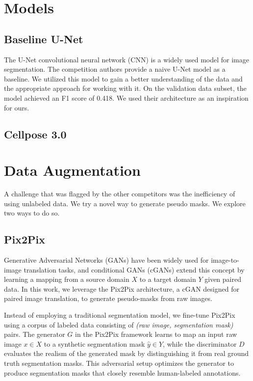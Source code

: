 \documentclass[]{article}
\begin{document}
\section{Models}

\subsection{Baseline U-Net}
The U-Net convolutional neural network (CNN) is a widely used model for image segmentation. The competition authors provide a naive U-Net model as a baseline. We utilized this model to gain a better understanding of the data and the appropriate approach for working with it. On the validation data subset, the model achieved an F1 score of 0.418. We used their architecture as an inspiration for ours.
\subsection{Cellpose 3.0}


\section{Data Augmentation}

A challenge that was flagged by the other competitors was the inefficiency of using unlabeled data. We try a novel way to generate pseudo masks. We explore two ways to do so.
\subsection{Pix2Pix}
Generative Adversarial Networks (GANs) have been widely used for image-to-image translation tasks, and conditional GANs (cGANs) extend this concept by learning a mapping from a source domain \( X \) to a target domain \( Y \) given paired data. In this work, we leverage the Pix2Pix architecture, a cGAN designed for paired image translation, to generate pseudo-masks from raw images.

Instead of employing a traditional segmentation model, we fine-tune Pix2Pix using a corpus of labeled data consisting of \textit{(raw image, segmentation mask)} pairs. The generator \( G \) in the Pix2Pix framework learns to map an input raw image \( x \in X \) to a synthetic segmentation mask \( \hat{y} \in Y \), while the discriminator \( D \) evaluates the realism of the generated mask by distinguishing it from real ground truth segmentation masks. This adversarial setup optimizes the generator to produce segmentation masks that closely resemble human-labeled annotations.
\end{document}
